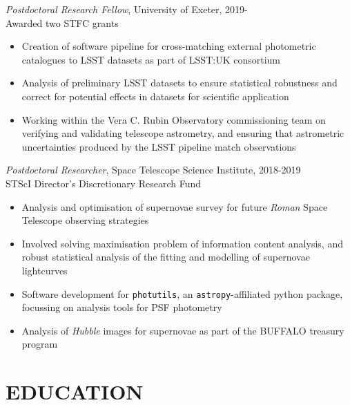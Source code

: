 \documentclass[letter, margin, 10pt]{res} %
\begin{document}
\begin{resume}
{\sl Postdoctoral Research Fellow}, University of Exeter, 2019-\\
\null\quad\quad Awarded two STFC grants
\begin{itemize}[noitemsep,topsep=0pt,parsep=0pt,partopsep=0pt]
\item Creation of software pipeline for cross-matching external photometric catalogues to LSST datasets as part of LSST:UK consortium
\item Analysis of preliminary LSST datasets to ensure statistical robustness and correct for potential effects in datasets for scientific application
\item Working within the Vera C. Rubin Observatory commissioning team on verifying and validating telescope astrometry, and ensuring that astrometric uncertainties produced by the LSST pipeline match observations
\end{itemize}
\vspace{-10pt}
{\sl Postdoctoral Researcher}, Space Telescope Science Institute, 2018-2019\\
\null\quad\quad STScI Director's Discretionary Research Fund
\begin{itemize}[noitemsep,topsep=0pt,parsep=0pt,partopsep=0pt]
\item Analysis and optimisation of supernovae survey for future \textit{Roman} Space Telescope observing strategies
\item Involved solving maximisation problem of information content analysis, and robust statistical analysis of the fitting and modelling of supernovae lightcurves
\item Software development for \texttt{photutils}, an \texttt{astropy}-affiliated python package, focussing on analysis tools for PSF photometry
\item Analysis of \textit{Hubble} images for supernovae as part of the BUFFALO treasury program
\end{itemize}
\vspace{-5pt}
\section{EDUCATION}


\end{resume}
\end{document}
